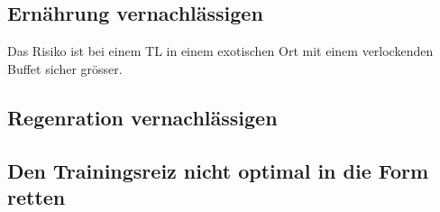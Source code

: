 \documentclass[a4paper,DIV13,BCOR0cm,draft=TRUE]{scrartcl}
\begin{document}
\subsection{Ernährung vernachlässigen}

Das Risiko ist bei einem TL in einem exotischen Ort mit einem verlockenden Buffet sicher grösser.

\subsection{Regenration vernachlässigen}

\subsection{Den Trainingsreiz nicht optimal in die Form retten}



% 

\end{document}

